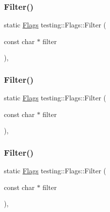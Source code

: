 \mbox{\label{structtesting_1_1_flags_afc7350b7c1ac4c0e0efe2d9a94729eb7}} 
\subsubsection{\texorpdfstring{Filter()}{Filter()}\hspace{0.1cm}{\footnotesize\ttfamily [1/3]}}
{\footnotesize\ttfamily static \mbox{\hyperlink{structtesting_1_1_flags}{Flags}} testing\+::\+Flags\+::\+Filter (\begin{DoxyParamCaption}\item[{const char $\ast$}]{filter }\end{DoxyParamCaption})\hspace{0.3cm}{\ttfamily [inline]}, {\ttfamily [static]}}

\mbox{\label{structtesting_1_1_flags_afc7350b7c1ac4c0e0efe2d9a94729eb7}} 
\subsubsection{\texorpdfstring{Filter()}{Filter()}\hspace{0.1cm}{\footnotesize\ttfamily [2/3]}}
{\footnotesize\ttfamily static \mbox{\hyperlink{structtesting_1_1_flags}{Flags}} testing\+::\+Flags\+::\+Filter (\begin{DoxyParamCaption}\item[{const char $\ast$}]{filter }\end{DoxyParamCaption})\hspace{0.3cm}{\ttfamily [inline]}, {\ttfamily [static]}}

\mbox{\label{structtesting_1_1_flags_afc7350b7c1ac4c0e0efe2d9a94729eb7}} 
\subsubsection{\texorpdfstring{Filter()}{Filter()}\hspace{0.1cm}{\footnotesize\ttfamily [3/3]}}
{\footnotesize\ttfamily static \mbox{\hyperlink{structtesting_1_1_flags}{Flags}} testing\+::\+Flags\+::\+Filter (\begin{DoxyParamCaption}\item[{const char $\ast$}]{filter }\end{DoxyParamCaption})\hspace{0.3cm}{\ttfamily [inline]}, {\ttfamily [static]}}

